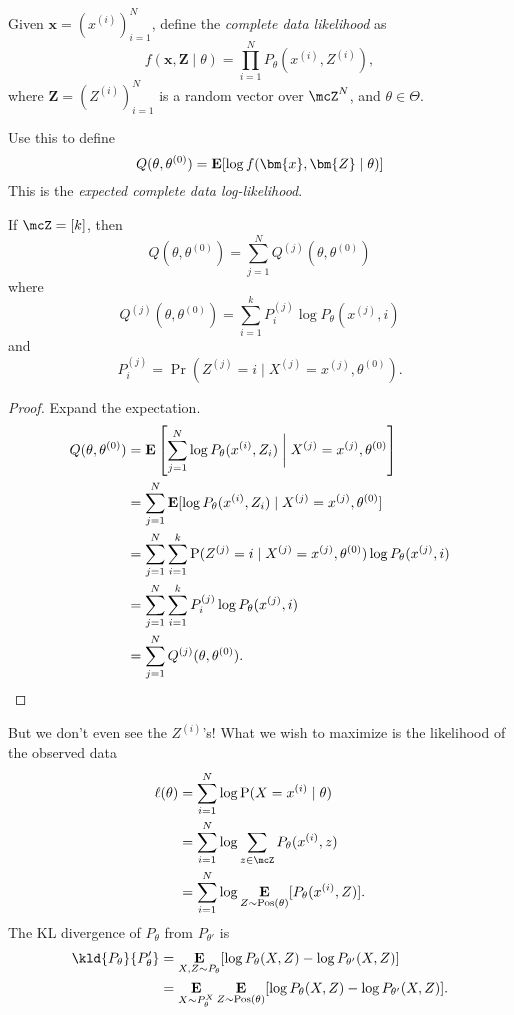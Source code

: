 \begin{definition*}
    Given $\bm{x} = (x^{(i)})_{i=1}^N$,
    define the \emph{complete data likelihood} as \[
        f(\bm{x}, \bm{Z} \mid \theta)
            = \prod_{i=1}^N P_\theta(x^{(i)}, Z^{(i)}),
    \] where $\bm{Z} = (Z^{(i)})_{i=1}^N$ is a random vector over $\mcZ^N$,
    and $\theta \in \Theta$.

    Use this to define \[
        Q(\theta, \theta^{(0)}) = \E[\log f(\bm{x}, \bm{Z} \mid \theta)]
    \] This is the \emph{expected complete data log-likelihood}.
\end{definition*}
\begin{proposition}
    If $\mcZ = [k]$, then \[
        Q(\theta, \theta^{(0)}) = \sum_{j=1}^N Q^{(j)}(\theta, \theta^{(0)})
    \] where \[
        Q^{(j)}(\theta, \theta^{(0)})
            = \sum_{i=1}^k P_i^{(j)} \log P_\theta(x^{(j)}, i)
    \] and \[
        P_i^{(j)} = \Pr(Z^{(j)} = i \mid X^{(j)} = x^{(j)}, \theta^{(0)}).
    \]
\end{proposition}
\begin{proof}
    Expand the expectation.
    \begin{align*}
        Q(\theta, \theta^{(0)})
            &= \operatorname*{\textbf{E}}\left[\sum_{j=1}^N \log P_\theta(x^{(i)}, Z_i)
                \biggm| X^{(j)} = x^{(j)}, \theta^{(0)}\right] \\
            &= \sum_{j=1}^N \operatorname*{\textbf{E}}[\log P_\theta(x^{(i)}, Z_i)
                \mid X^{(j)} = x^{(j)}, \theta^{(0)}] \\
            &= \sum_{j=1}^N \sum_{i=1}^k \operatorname{P}(Z^{(j)} = i \mid X^{(j)} = x^{(j)}, \theta^{(0)}) \log P_\theta(x^{(j)}, i) \\
            &= \sum_{j=1}^N \sum_{i=1}^k P_i^{(j)} \log P_\theta(x^{(j)}, i) \\
            &= \sum_{j=1}^N Q^{(j)}(\theta, \theta^{(0)}). \qedhere
    \end{align*}
\end{proof}

But we don't even see the $Z^{(i)}$'s!
What we wish to maximize is the likelihood of the observed data \begin{align*}
    \ell(\theta) &= \sum_{i=1}^N \log \Pr(X = x^{(i)} \mid \theta) \\
         &= \sum_{i=1}^N \log \sum_{z \in \mcZ} P_\theta(x^{(i)}, z) \\
         &= \sum_{i=1}^N \log \E_{Z \sim \Pos(\theta)}[P_\theta(x^{(i)}, Z)].
\end{align*} The KL divergence of $P_\theta$ from $P_{\theta'}$ is \begin{align*}
    \kld{P_\theta}{P_\theta'}
        &= \E_{X, Z \sim P_\theta}[\log P_\theta(X, Z) - \log P_{\theta'}(X, Z)] \\
        &= \E_{X \sim P_\theta^X} \E_{Z \sim \Pos(\theta)}[\log P_\theta(X, Z) - \log P_{\theta'}(X, Z)].
\end{align*}
